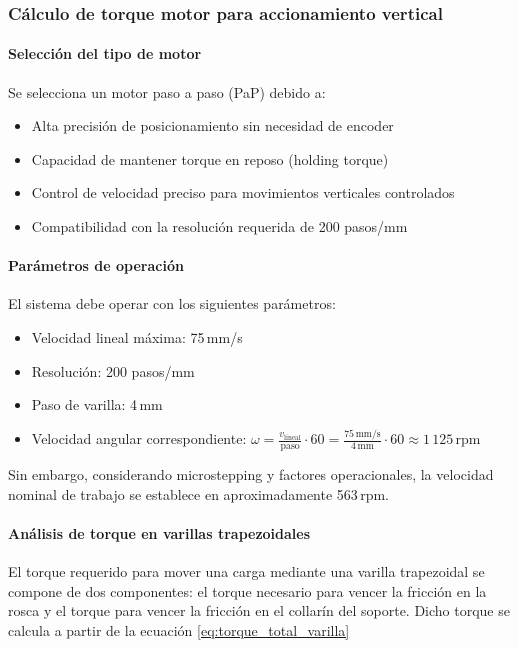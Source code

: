 \subsubsection{Cálculo de torque motor para accionamiento vertical}

\paragraph{Selección del tipo de motor}
Se selecciona un motor paso a paso (PaP) debido a:
\begin{itemize}
    \item Alta precisión de posicionamiento sin necesidad de encoder
    \item Capacidad de mantener torque en reposo (holding torque)
    \item Control de velocidad preciso para movimientos verticales controlados
    \item Compatibilidad con la resolución requerida de 200 pasos/mm
\end{itemize}

\paragraph{Parámetros de operación}
El sistema debe operar con los siguientes parámetros:
\begin{itemize}
    \item Velocidad lineal máxima: 75\,mm/s
    \item Resolución: 200 pasos/mm
    \item Paso de varilla: 4\,mm
    \item Velocidad angular correspondiente: $\omega = \frac{v_{\text{lineal}}}{\text{paso}} \cdot 60 = \frac{75\,\text{mm/s}}{4\,\text{mm}} \cdot 60 \approx 1\,125$\,rpm
\end{itemize}

Sin embargo, considerando microstepping y factores operacionales, la velocidad nominal de trabajo se establece en aproximadamente 563\,rpm.

\paragraph{Análisis de torque en varillas trapezoidales}
El torque requerido para mover una carga mediante una varilla trapezoidal se compone de dos componentes: el torque necesario para vencer la fricción en la rosca y el torque para vencer la fricción en el collarín del soporte. Dicho torque se calcula a partir de la ecuación \ref{eq:torque_total_varilla}

